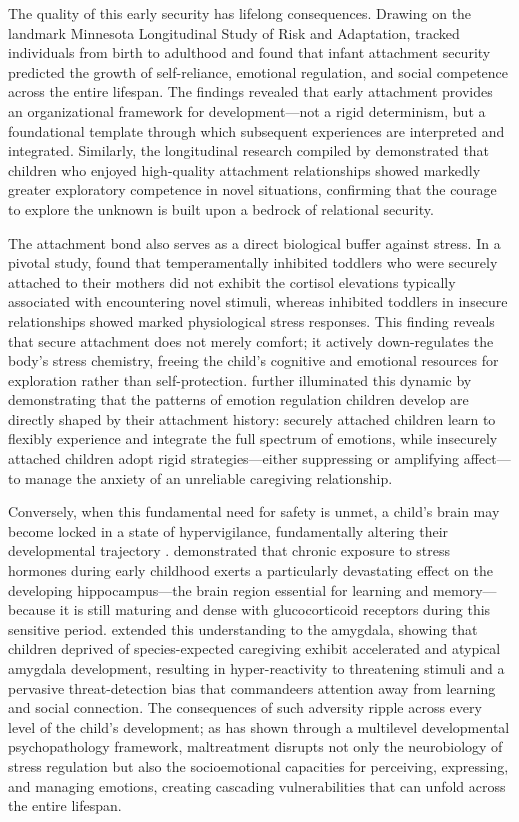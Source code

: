 The quality of this early security has lifelong consequences.
Drawing on the landmark Minnesota Longitudinal Study of Risk and Adaptation, \citet{sroufe2005} tracked individuals from birth to adulthood and found that infant attachment security predicted the growth of self-reliance, emotional regulation, and social competence across the entire lifespan.
The findings revealed that early attachment provides an organizational framework for development---not a rigid determinism, but a foundational template through which subsequent experiences are interpreted and integrated.
Similarly, the longitudinal research compiled by \citet{grossmann2005} demonstrated that children who enjoyed high-quality attachment relationships showed markedly greater exploratory competence in novel situations, confirming that the courage to explore the unknown is built upon a bedrock of relational security.

The attachment bond also serves as a direct biological buffer against stress.
In a pivotal study, \citet{nachmias1996} found that temperamentally inhibited toddlers who were securely attached to their mothers did not exhibit the cortisol elevations typically associated with encountering novel stimuli, whereas inhibited toddlers in insecure relationships showed marked physiological stress responses.
This finding reveals that secure attachment does not merely comfort; it actively down-regulates the body's stress chemistry, freeing the child's cognitive and emotional resources for exploration rather than self-protection.
\citet{cassidy1994} further illuminated this dynamic by demonstrating that the patterns of emotion regulation children develop are directly shaped by their attachment history: securely attached children learn to flexibly experience and integrate the full spectrum of emotions, while insecurely attached children adopt rigid strategies---either suppressing or amplifying affect---to manage the anxiety of an unreliable caregiving relationship.

Conversely, when this fundamental need for safety is unmet, a child's brain may become locked in a state of hypervigilance, fundamentally altering their developmental trajectory \citep{vanderkolk2014}.
\citet{lupien2009} demonstrated that chronic exposure to stress hormones during early childhood exerts a particularly devastating effect on the developing hippocampus---the brain region essential for learning and memory---because it is still maturing and dense with glucocorticoid receptors during this sensitive period.
\citet{tottenham2012} extended this understanding to the amygdala, showing that children deprived of species-expected caregiving exhibit accelerated and atypical amygdala development, resulting in hyper-reactivity to threatening stimuli and a pervasive threat-detection bias that commandeers attention away from learning and social connection.
The consequences of such adversity ripple across every level of the child's development; as \citet{cicchetti2016} has shown through a multilevel developmental psychopathology framework, maltreatment disrupts not only the neurobiology of stress regulation but also the socioemotional capacities for perceiving, expressing, and managing emotions, creating cascading vulnerabilities that can unfold across the entire lifespan.

